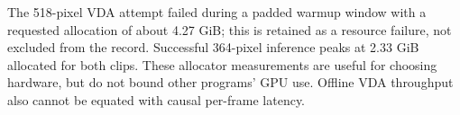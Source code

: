 The 518-pixel VDA attempt failed during a padded warmup window with a requested allocation of about 4.27 GiB; this is retained as a resource failure, not excluded from the record. Successful 364-pixel inference peaks at 2.33 GiB allocated for both clips. These allocator measurements are useful for choosing hardware, but do not bound other programs' GPU use. Offline VDA throughput also cannot be equated with causal per-frame latency.
